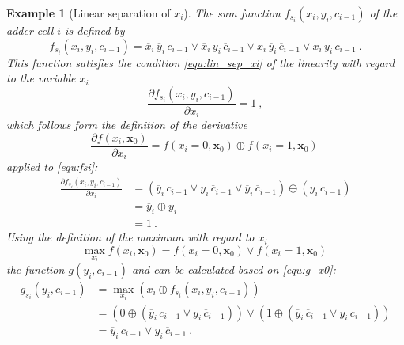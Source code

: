 \documentclass[12pt]{toptesi}
\newcommand\bx{\mathbf{x}}
\newtheorem{example}{Example}
\begin{document}
\begin{example}[Linear separation of $x_i$]
The sum function $f_{s_i}(x_i, y_i, c_{i-1})$ of the adder cell $i$ is defined by
\begin{equation}
f_{s_i}(x_i,y_i,c_{i-1}) = 
\overline{x}_i\, \overline{y}_i\, c_{i-1} \vee
\overline{x}_i\, y_i\, \overline{c}_{i-1} \vee
x_i\, \overline{y}_i\, \overline{c}_{i-1} \vee
x_i\, y_i\, c_{i-1} ~.
\label{equ:fsi}
\end{equation}
This function satisfies the condition \eqref{equ:lin_sep_xi} of the linearity with regard to the variable $x_i$
\begin{equation}
\frac{\partial f_{s_i}(x_i,y_i,c_{i-1}) }{\partial x_i} = 1~,
\label{equ:fsi_lin_xi}
\end{equation}
which follows form the definition of the derivative
\begin{equation}
\frac{\partial f(x_i,\bx_0)}{\partial x_i} = f(x_i=0,\bx_0) \oplus f(x_i=1,\bx_0)~
\label{equ:sder_def_xi}
\end{equation}
applied to \eqref{equ:fsi}:
\begin{align*}
	\frac{\partial f_{s_i}(x_i,y_i,c_{i-1}) }{\partial x_i} 
	&= 
(
\overline{y}_i\, c_{i-1} \vee
y_i\, \overline{c}_{i-1} \vee
\overline{y}_i\, \overline{c}_{i-1})
\oplus
(y_i\, c_{i-1})\\
	&= 
\overline{y}_i \oplus
y_i\, \\
	&= 1~.
\end{align*}
Using the definition of the maximum with regard to $x_i$
\begin{equation}
\max_{x_i} f(x_i,\bx_0) = f(x_i=0,\bx_0) \vee f(x_i=1,\bx_0)~
\label{equ:smax_def_xi}
\end{equation}
the function $g(y_i,c_{i-1})$ and can be calculated based on \eqref{equ:g_x0}:
\begin{align*}
	g_{s_i}(y_i,c_{i-1}) &= \max_{x_i} \left(x_i \oplus f_{s_i}(x_i,y_i,c_{i-1}) \right)\\
	&= \left(0 \oplus 
	(
	\overline{y}_i\, c_{i-1} \vee
y_i\, \overline{c}_{i-1}  
)
	\right)
\vee
\left(1 \oplus 
	(
\overline{y}_i\, \overline{c}_{i-1} \vee
y_i\, c_{i-1} 
)
	\right)
	\\
		&= 
	\overline{y}_i\, c_{i-1} \vee
y_i\, \overline{c}_{i-1}~. 
\end{align*}
\begin{figure}[b]
	\centering
\begin{tikzpicture}[circuit logic US,
block/.style={rectangle,draw,
text width=1.6cm,
text centered,font=\sffamily,anchor=center},
]	

\end{tikzpicture}
\end{figure}
\end{example}
\end{document}
